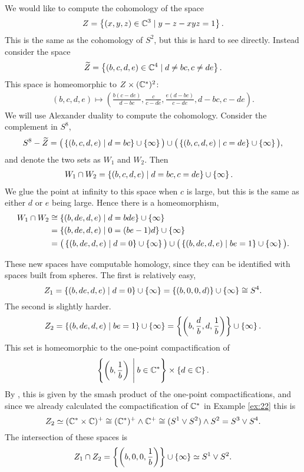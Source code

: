 \begin{example}
  We would like to compute the cohomology of the space 
  \[ Z = \left\{  (x,y,z)\in\mathbb{C}^3 \mid y-z -xyz = 1 \right\}. \]
  This is the same as the cohomology of $S^2$, but this is hard to see
  directly. Instead consider the space
  \[ \widetilde Z = \left\{ (b,c,d,e) \in \mathbb{C}^4 \mid d\neq
    bc, c\neq de \right\}. \]
  This space is homeomorphic to $Z\times (\mathbb{C}^*)^2$:
  \begin{align*}
    (b,c,d,e) \mapsto \left(
    \frac{b(c-de)}{d-bc}, \frac{c}{c-de}, \frac{e(d-bc)}{c-de},
    d-bc, c-de\right).
  \end{align*}
  We will use Alexander duality to compute the cohomology. Consider
  the complement in $S^8$,
  \[ S^8-\widetilde Z = \big(\left\{ (b,c,d,e) \mid d =
      bc \right\}\cup\left\{ \infty \right\}\big) \cup \big(\left\{ (b,c,d,e)
    \mid c = de \right\} \cup \left\{ \infty \right\}\big), \]
  and denote the two sets as $W_1$ and $W_2$. Then
  \begin{align*}
    W_1\cap W_2 &= \left\{ (b,c,d,e) \mid d=bc,c=de \right\}\cup\left\{ \infty \right\}.
  \end{align*}
  We glue the point at infinity to this space when $c$ is large, but
  this is the same as either $d$ or $e$ being large. Hence there is a
  homeomorphism,
  \begin{align*}
    W_1\cap W_2 &\cong \left\{ (b,de,d,e) \mid d=bde \right\}\cup\left\{ \infty \right\} \\
                &= \left\{ (b,de,d,e)\mid 0 = (be-1)d \right\}\cup\left\{ \infty \right\} \\
                &= \big(\left\{ (b,de,d,e) \mid d =
                  0 \right\}\cup\left\{ \infty \right\}\big) \cup \big(\left\{ (b,de,d,e) 
                  \mid be=1 \right\}\cup\left\{ \infty \right\}\big).
  \end{align*}
  
  These new spaces have computable homology, since they can be
  identified with spaces built from spheres. The first is relatively
  easy,
  \[ Z_1 = \left\{ (b,de,d,e)\mid d = 0 \right\}\cup \left\{ \infty \right\} =
  \left\{ (b,0,0,d) \right\}\cup\left\{ \infty \right\} \cong S^4. \]
  The second is slightly harder.
  \[ Z_2 =\left\{ (b,de,d,e)\mid be=1 \right\}\cup\left\{ \infty \right\}=
  \left\{ \left(b,\frac{d}{b},d,\frac{1}{b} \right)  \right\}\cup\left\{ \infty \right\}. \]
  This set is homeomorphic to the one-point compactification of
  \[ \left\{ \left(b,\frac{1}{b}\right) \:\Bigg\vert\: b\in\mathbb{C}^* \right\} \times
  \left\{ d\in\mathbb{C} \right\}. \]
  By \cite[Chapter~2.3]{dupontk}, this
  is given by the smash product of the one-point compactifications,
  and since we already calculated the compactification of $\mathbb{C}^*$ in
  Example \ref{ex:22} this is
  \[ Z_2\simeq (\mathbb{C}^*\times\mathbb{C})^+ \cong (\mathbb{C}^*)^+\wedge\mathbb{C}^+ \cong (S^1\vee
  S^2) \wedge S^2 = S^3 \vee S^4. \]
  The intersection of these spaces is
  \[ Z_1\cap Z_2 = \left\{ \left(b,0,0,\frac{1}{b}\right) \right\}\cup\left\{ \infty \right\}
  \simeq S^1\vee S^2. \]
  

\end{example}
